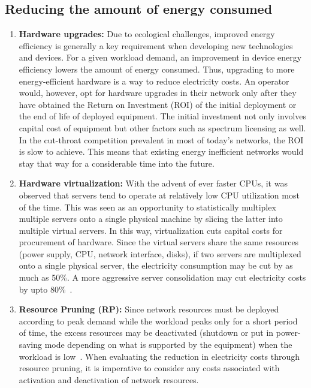 \subsection{Reducing the amount of energy consumed}
\begin{enumerate}
\item \textbf{Hardware upgrades:} Due to ecological challenges, improved energy efficiency is generally a key requirement when developing new technologies and devices. For a given workload demand, an improvement in device energy efficiency lowers the amount of energy consumed. Thus, upgrading to more energy-efficient hardware is a way to reduce electricity costs. An operator would, however, opt for hardware upgrades in their network only after they have obtained the Return on Investment (ROI) of the initial deployment or the end of life of deployed equipment. The initial investment not only involves capital cost of equipment but other factors such as spectrum licensing as well. In the cut-throat competition prevalent in most of today's networks, the ROI is slow to achieve. This means that existing energy inefficient networks would stay that way for a considerable time into the future.
\item \textbf{Hardware virtualization:} With the advent of ever faster CPUs, it was observed that servers tend to operate at relatively low CPU utilization most of the time. This was seen as an opportunity to statistically multiplex multiple servers onto a single physical machine by slicing the latter into multiple virtual servers. In this way, virtualization cuts capital costs for procurement of hardware. Since the virtual servers share the same resources (power supply, CPU, network interface, disks), if two servers are multiplexed onto a single physical server, the electricity consumption may be cut by as much as 50\%. A more aggressive server consolidation may cut electricity costs by upto 80\%~\cite{VirtualizationCutsPower}.
\item \textbf{Resource Pruning (RP):} Since network resources must be deployed according to peak demand while the workload peaks only for a short period of time, the excess resources may be deactivated (shutdown or put in power-saving mode depending on what is supported by the equipment) when the workload is low~\cite{Chase:2001:MES:502059.502045,Chen:2008:ESP:1387589.1387613,Meisner:2009:PES:1508244.1508269,Lin_dynamicright-sizing,Peng:2011:TPS:2030613.2030628}. When evaluating the reduction in electricity costs through resource pruning, it is imperative to consider any costs associated with activation and deactivation of network resources.
\end{enumerate}

